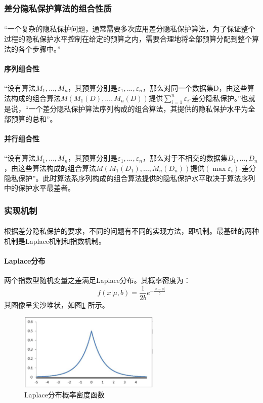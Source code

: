 \documentclass[12pt,a4paper]{article}
\begin{document}
\subsubsection{差分隐私保护算法的组合性质}
\paragraph{} “一个复杂的隐私保护问题，通常需要多次应用差分隐私保护算法，为了保证整个过程的隐私保护水平控制在给定的预算之内，需要合理地将全部预算分配到整个算法的各个步骤中。”
\paragraph{序列组合性} “设有算法$M_1,...,M_n$，其预算分别是$\varepsilon_1,...,\varepsilon_n$，那么对同一个数据集D，由这些算法构成的组合算法$M(M_1(D),...,M_n(D))$提供$\sum_{i=1}^n \varepsilon_i$-差分隐私保护。”也就是说，“一个差分隐私保护算法序列构成的组合算法，其提供的隐私保护水平为全部预算的总和”。
\paragraph{并行组合性} “设有算法$M_1,...,M_n$，其预算分别是$\varepsilon_1,...,\varepsilon_n$，那么对于不相交的数据集$D_1,...,D_n$，由这些算法构成的组合算法$M(M_1(D_1),...,M_n(D_n))$提供$(\max \varepsilon_i)$-差分隐私保护”。此时算法系序列构成的组合算法提供的隐私保护水平取决于算法序列中的保护水平最差者。
\subsubsection{实现机制}
\paragraph{} 根据差分隐私保护的要求，不同的问题有不同的实现方法，即机制。最基础的两种机制是Laplace机制和指数机制。
\paragraph{Laplace分布} 两个指数型随机变量之差满足Laplace分布。其概率密度为：
\begin{equation}
	f(x|\mu,b) = \frac{1}{2b}e^{-\frac{|x-\mu|}{b} }
\end{equation}
其图像呈尖沙堆状，如图\ref{laplace-distribution} 所示。
\begin{figure}[H]
	\centering
	\includegraphics[width=0.6\textwidth]{../images/laplace-distribution.png}
	\caption{Laplace分布概率密度函数}
	\label{laplace-distribution}
\end{figure}
\end{document}
